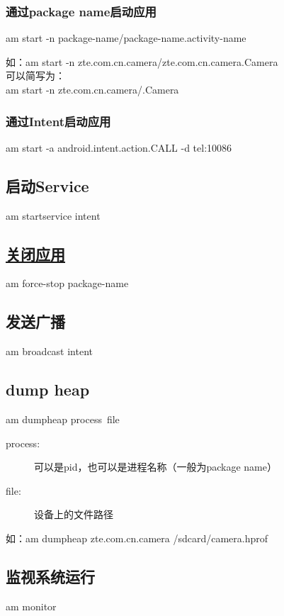 \subsubsection[通过package name启动应用]{通过package name启动应用}
am start -n \lt package-name\gt/\lt package-name.activity-name\gt

如：am start -n zte.com.cn.camera/zte.com.cn.camera.Camera\\
可以简写为：\\
am start -n zte.com.cn.camera/.Camera

\subsubsection[通过Intent启动应用]{通过Intent启动应用}
am start -a android.intent.action.CALL -d tel:10086

\subsection[启动Service]{启动Service}
am startservice \lt intent\gt

\subsection[关闭应用]{\underline{关闭应用}}
am force-stop \lt package-name\gt

\subsection[发送广播]{发送广播}
am broadcast \lt intent\gt

\subsection[dump heap]{dump heap}
am dumpheap \lt process\gt\ \lt file\gt

\begin{description}
\item[process:] 可以是pid，也可以是进程名称（一般为package name）
\item[file:] 设备上的文件路径
\end{description}
如：am dumpheap zte.com.cn.camera /sdcard/camera.hprof

\subsection[监视系统运行]{监视系统运行}
am monitor

